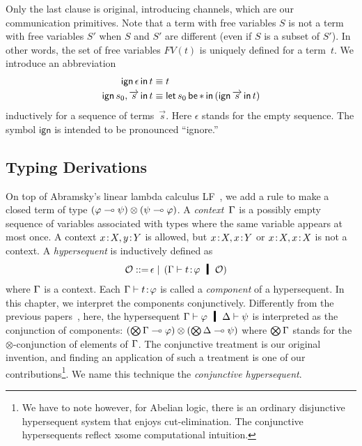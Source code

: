 Only the last clause is original,
introducing channels, which are our communication primitives.
Note that a term with free variables $S$ is not a term with free
variables $S'$ when $S$ and $S'$ are different (even if $S$ is a subset
of $S'$).
In other words, the set of free variables $FV(t)$ is uniquely defined
for a term~$t$.
We introduce an abbreviation
\begin{align*}
 \mathsf{ign }\,{\epsilon}\,\mathsf{ in }\,{t}   & \equiv t\\
 \mathsf{ign }\,{s_0,\overrightarrow s}\,\mathsf{ in }\,{t} & \equiv \mathsf{let }\,{s_0}\,\mathsf{ be }\,{\ast}\,\mathsf{ in }\,{(\mathsf{ign }\,{\overrightarrow s}\,\mathsf{ in }\,{t})}
\end{align*}
inductively for a sequence of terms~$\vec s$.
Here $\epsilon$ stands for the empty sequence.
The symbol $\mathsf{ign}$ is intended to be pronounced ``ignore.''

\subsection{Typing Derivations}

On top of Abramsky's linear lambda calculus
LF~\citep{abramsky1993computational}, we add a rule to
make a closed term of type $(\varphi\multimap\psi)\otimes(\psi\multimap\varphi)$.
A \textit{context}~$\Gamma$ is a possibly empty sequence of
variables associated with
types where the same variable appears at most once.
A context ${x} \mathord{\colon\kern -2pt}{X}, {y} \mathord{\colon\kern -2pt}{Y}$ is allowed, but ${x} \mathord{\colon\kern -2pt}{X}, {x} \mathord{\colon\kern -2pt}{Y}$
or ${x} \mathord{\colon\kern -2pt}{X},{x} \mathord{\colon\kern -2pt}{X}$ is not a context.
A \textit{hypersequent} is inductively defined as
\begin{align*}
 \hypert ::=\, & \epsilon
 \mid\, (\G\tr\tj{t}{\phi}\hmid \hypert)
\end{align*}
where $\Gamma$ is a context.
Each $\Gamma\vdash{t} \mathord{\colon\kern -2pt}{\varphi}$ is called a \textit{component}
of a hypersequent.
In this chapter, we interpret the components conjunctively.
Differently from the previous
papers~\citep{avron91,Baaz01122003,avrontableau,avron96},
here, the hypersequent $\G\tr\phi\hmid \D\tr\psi$ is interpreted as the
conjunction of components:
$(\bigotimes\Gamma\multimap\varphi)\otimes (\bigotimes\Delta\multimap\psi)$ where
$\bigotimes\Gamma$ stands for the $\otimes$-conjunction of elements of $\Gamma$.
The conjunctive treatment is our original invention, and finding an application
of such a treatment is one of our contributions\footnote{We have to note
however, for Abelian logic, there is an ordinary disjunctive
hypersequent system that enjoys cut-elimination.  The conjunctive
hypersequents reflect xsome computational intuition.
}.
We name this technique the \textit{conjunctive
hypersequent}.

